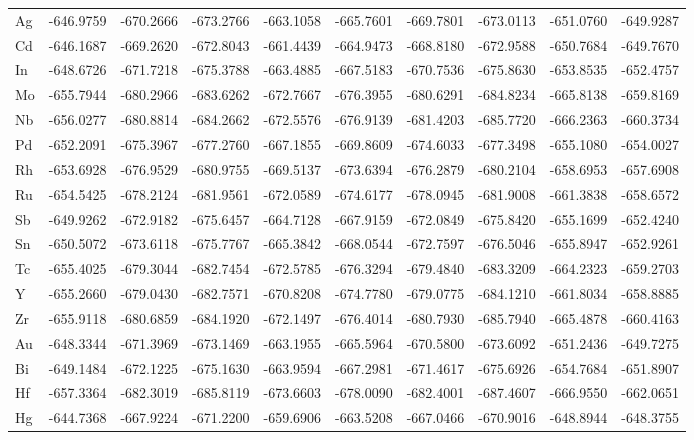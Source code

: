 \begin{table}[htbp]
{\begin{tabular}{l *{9}{l}}
        Ag	& -646.9759	&-670.2666	&-673.2766	&-663.1058	&-665.7601	&-669.7801	&-673.0113	&-651.0760  &-649.9287 \\
        Cd	& -646.1687	&-669.2620  &-672.8043	&-661.4439	&-664.9473	&-668.8180  &-672.9588	&-650.7684	&-649.7670 \\
        In	& -648.6726	&-671.7218	&-675.3788	&-663.4885	&-667.5183	&-670.7536	&-675.8630  &-653.8535	&-652.4757 \\
        Mo	& -655.7944	&-680.2966	&-683.6262	&-672.7667	&-676.3955	&-680.6291	&-684.8234	&-665.8138	&-659.8169 \\
        Nb	& -656.0277	&-680.8814	&-684.2662	&-672.5576	&-676.9139	&-681.4203	&-685.7720  &-666.2363	&-660.3734 \\
        Pd	& -652.2091	&-675.3967	&-677.2760  &-667.1855	&-669.8609	&-674.6033	&-677.3498	&-655.1080  &-654.0027 \\
        Rh	& -653.6928	&-676.9529	&-680.9755	&-669.5137	&-673.6394	&-676.2879	&-680.2104	&-658.6953	&-657.6908 \\
        Ru	& -654.5425	&-678.2124	&-681.9561	&-672.0589	&-674.6177	&-678.0945	&-681.9008	&-661.3838	&-658.6572 \\
        Sb	& -649.9262	&-672.9182	&-675.6457	&-664.7128	&-667.9159	&-672.0849	&-675.8420 	&-655.1699	&-652.4240 \\
        Sn	& -650.5072	&-673.6118	&-675.7767	&-665.3842	&-668.0544	&-672.7597	&-676.5046	&-655.8947	&-652.9261 \\
        Tc	& -655.4025	&-679.3044	&-682.7454	&-672.5785	&-676.3294	&-679.4840  &-683.3209	&-664.2323	&-659.2703 \\
        Y	  & -655.2660 &-679.0430	&-682.7571	&-670.8208	&-674.7780  &-679.0775	&-684.1210  &-661.8034	&-658.8885 \\
        Zr	& -655.9118	&-680.6859	&-684.1920  &-672.1497	&-676.4014	&-680.7930  &-685.7940  &-665.4878	&-660.4163 \\
        Au	& -648.3344	&-671.3969	&-673.1469	&-663.1955	&-665.5964	&-670.5800	&-673.6092	&-651.2436	&-649.7275 \\
        Bi	& -649.1484	&-672.1225	&-675.1630  &-663.9594	&-667.2981	&-671.4617	&-675.6926	&-654.7684	&-651.8907 \\
        Hf	& -657.3364	&-682.3019	&-685.8119	&-673.6603	&-678.0090  &-682.4001	&-687.4607	&-666.9550  &-662.0651 \\
        Hg	& -644.7368	&-667.9224	&-671.2200	&-659.6906	&-663.5208	&-667.0466	&-670.9016	&-648.8944	&-648.3755 \\

\end{tabular}}
\end{table}
